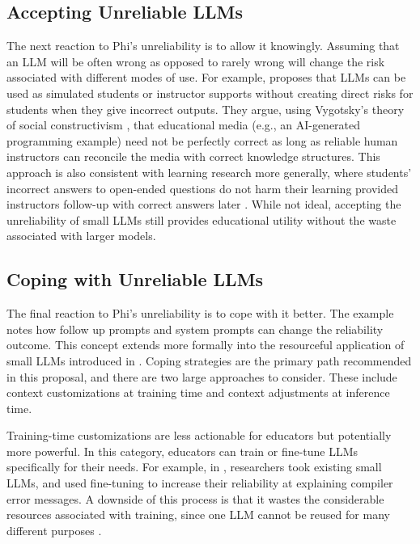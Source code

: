 \subsection{Accepting Unreliable LLMs}\label{accepting-unreliable-llms}

The next reaction to Phi's unreliability is to allow it knowingly. Assuming that an LLM will be often wrong as opposed to rarely wrong will change the risk associated with different modes of use. For example, \cite{falknerEffectiveUseLarge2026} proposes that LLMs can be used as simulated students or instructor supports without creating direct risks for students when they give incorrect outputs. They argue, using Vygotsky's theory of social constructivism \cite{vygotskyMindSocietyDevelopment1978a}, that educational media (e.g., an AI-generated programming example) need not be perfectly correct as long as reliable human instructors can reconcile the media with correct knowledge structures. This approach is also consistent with learning research more generally, where students' incorrect answers to open-ended questions do not harm their learning provided instructors follow-up with correct answers later \cite{langSmallTeachingEveryday2021}. While not ideal, accepting the unreliability of small LLMs still provides educational utility without the waste associated with larger models.

\subsection{Coping with Unreliable LLMs}\label{coping-with-unreliable-llms}

The final reaction to Phi's unreliability is to cope with it better. The example notes how follow up prompts and system prompts can change the reliability outcome. This concept extends more formally into the resourceful application of small LLMs introduced in . Coping strategies are the primary path recommended in this proposal, and there are two large approaches to consider. These include context customizations at training time and context adjustments at inference time.

Training-time customizations are less actionable for educators but potentially more powerful. In this category, educators can train or fine-tune LLMs specifically for their needs. For example, in \cite{solanoFineTuningOpenSourceModels2026}, researchers took existing small LLMs, and used fine-tuning to increase their reliability at explaining compiler error messages. A downside of this process is that it wastes the considerable resources associated with training, since one LLM cannot be reused for many different purposes \cite{renReconcilingContrastingNarratives2024,solanoFineTuningOpenSourceModels2026}.

